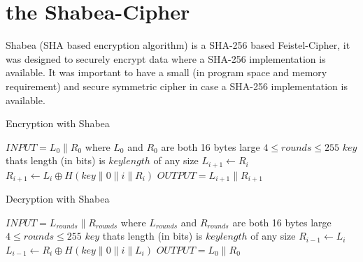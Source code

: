 \section{the Shabea-Cipher}
Shabea (SHA based encryption algorithm) is a SHA-256 based Feistel-Cipher, it was designed to securely encrypt data where a SHA-256 implementation is available. It was important to have a small (in program space and memory requirement) and secure symmetric cipher in case a SHA-256 implementation is available.

\begin{algorithm}
\caption{Encryption with Shabea}
\label{algShabeaEnc}
\begin{algorithmic}
\REQUIRE $INPUT = L_0 \parallel R_0$ where $L_0$ and $R_0$ are both 16 bytes large
\REQUIRE $4\leq rounds\leq 255$
\REQUIRE $key$ thats length (in bits) is $keylength$ of any size
\STATE $L_{i+1} \leftarrow R_i$
\STATE $R_{i+1} \leftarrow L_i \oplus H(key \parallel 0 \parallel i \parallel R_i)$
\ENDFOR
\STATE $OUTPUT = L_{i+1} \parallel R_{i+1}$
\end{algorithmic}
\end{algorithm}

\begin{algorithm}
\caption{Decryption with Shabea}
\label{algShabeaDec}
\begin{algorithmic}
\REQUIRE $INPUT = L_{rounds} \parallel R_{rounds}$ where $L_{rounds}$ and $R_{rounds}$ are both 16 bytes large
\REQUIRE $4\leq rounds\leq 255$
\REQUIRE $key$ thats length (in bits) is $keylength$ of any size
\STATE $R_{i-1} \leftarrow L_i$
\STATE $L_{i-1} \leftarrow R_i \oplus H(key \parallel 0 \parallel i \parallel L_i)$
\ENDFOR
\STATE $OUTPUT = L_0 \parallel R_0$
\end{algorithmic}
\end{algorithm}